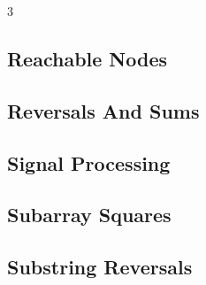 \documentclass[8pt]{extarticle}
\begin{document}
\begin{multicols*}{3}
\subsection{Reachable Nodes}
\begin{caixaenunciado}

\end{caixaenunciado}
\vspace{0.3cm}


\subsection{Reversals And Sums}
\begin{caixaenunciado}

\end{caixaenunciado}
\vspace{0.3cm}


\subsection{Signal Processing}
\begin{caixaenunciado}

\end{caixaenunciado}
\vspace{0.3cm}


\subsection{Subarray Squares}
\begin{caixaenunciado}

\end{caixaenunciado}
\vspace{0.3cm}


\subsection{Substring Reversals}
\begin{caixaenunciado}

\end{caixaenunciado}
\vspace{0.3cm}



\end{multicols*}
\end{document}
